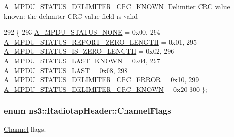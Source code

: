 \begin{Desc}
\begin{description}
{A\+\_\+\+M\+P\+D\+U\+\_\+\+S\+T\+A\+T\+U\+S\+\_\+\+D\+E\+L\+I\+M\+I\+T\+E\+R\+\_\+\+C\+R\+C\+\_\+\+K\+N\+O\+WN\hypertarget{classns3_1_1RadiotapHeader_a9f8333ba19c8dc9ae63e7e03af87a557abb6bed35bef11dd95a696d65994cf7db}{}\label{classns3_1_1RadiotapHeader_a9f8333ba19c8dc9ae63e7e03af87a557abb6bed35bef11dd95a696d65994cf7db}
}]Delimiter C\+RC value known\+: the delimiter C\+RC value field is valid \end{description}
\end{Desc}

\begin{DoxyCode}
292   \{
293     \hyperlink{classns3_1_1RadiotapHeader_a9f8333ba19c8dc9ae63e7e03af87a557a223cc9f40442a69cce17a841b7c750dc}{A\_MPDU\_STATUS\_NONE}                = 0x00, 
294     \hyperlink{classns3_1_1RadiotapHeader_a9f8333ba19c8dc9ae63e7e03af87a557a32af8934a9f8eae371406fe449712487}{A\_MPDU\_STATUS\_REPORT\_ZERO\_LENGTH}  = 0x01, 
295     \hyperlink{classns3_1_1RadiotapHeader_a9f8333ba19c8dc9ae63e7e03af87a557a0b1a6558b9b8829c7dec7f3dcd223968}{A\_MPDU\_STATUS\_IS\_ZERO\_LENGTH}      = 0x02, 
296     \hyperlink{classns3_1_1RadiotapHeader_a9f8333ba19c8dc9ae63e7e03af87a557ad9c553bb630ebec01fc4cfe8ff68ec9a}{A\_MPDU\_STATUS\_LAST\_KNOWN}          = 0x04, 
297     \hyperlink{classns3_1_1RadiotapHeader_a9f8333ba19c8dc9ae63e7e03af87a557ae15e8d17497685bcc4428548af011f1b}{A\_MPDU\_STATUS\_LAST}                = 0x08, 
298     \hyperlink{classns3_1_1RadiotapHeader_a9f8333ba19c8dc9ae63e7e03af87a557ad7525ec5c16fe46c765306b3c78d2494}{A\_MPDU\_STATUS\_DELIMITER\_CRC\_ERROR} = 0x10, 
299     \hyperlink{classns3_1_1RadiotapHeader_a9f8333ba19c8dc9ae63e7e03af87a557abb6bed35bef11dd95a696d65994cf7db}{A\_MPDU\_STATUS\_DELIMITER\_CRC\_KNOWN} = 0x20  
300   \};
\end{DoxyCode}
\subsubsection[{\texorpdfstring{Channel\+Flags}{ChannelFlags}}]{\setlength{\rightskip}{0pt plus 5cm}enum {\bf ns3\+::\+Radiotap\+Header\+::\+Channel\+Flags}}\hypertarget{classns3_1_1RadiotapHeader_a26df5fbb86499c692bd97a99781c8140}{}\label{classns3_1_1RadiotapHeader_a26df5fbb86499c692bd97a99781c8140}


\hyperlink{classns3_1_1Channel}{Channel} flags. 

